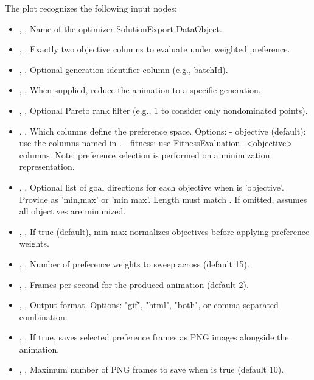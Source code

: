 The  plot recognizes the following input nodes:
\begin{itemize}
  \item {}, , Name of the optimizer SolutionExport DataObject.
  \item {}, , Exactly two objective columns to evaluate under weighted preference.
  \item {}, , Optional generation identifier column (e.g., batchId).
  \item {}, , When  supplied, reduce the animation to a specific generation.
  \item {}, , Optional Pareto rank filter (e.g., 1 to consider only nondominated points).
  \item {}, , Which columns define the preference space. Options: - objective (default): use the columns named in . - fitness: use FitnessEvaluation\_\textless{}objective\textgreater{} columns. Note: preference selection is performed on a minimization representation.
  \item {}, , Optional list of goal directions for each objective when  is 'objective'. Provide as 'min,max' or 'min max'. Length must match . If omitted, assumes all objectives are minimized.
  \item {}, , If true (default), min-max normalizes objectives before applying preference weights.
  \item {}, , Number of preference weights to sweep across (default 15).
  \item {}, , Frames per second for the produced animation (default 2).
  \item {}, , Output format. Options: "gif", "html", "both", or comma-separated combination.
  \item {}, , If true, saves selected preference frames as PNG images alongside the animation.
  \item {}, , Maximum number of PNG frames to save when  is true (default 10).
\end{itemize}

